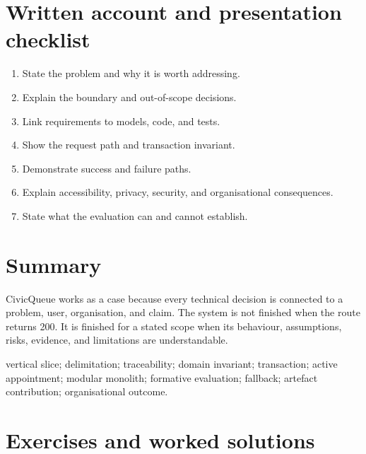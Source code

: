 \section{Written account and presentation checklist}
\begin{enumerate}
\item State the problem and why it is worth addressing.
\item Explain the boundary and out-of-scope decisions.
\item Link requirements to models, code, and tests.
\item Show the request path and transaction invariant.
\item Demonstrate success and failure paths.
\item Explain accessibility, privacy, security, and organisational consequences.
\item State what the evaluation can and cannot establish.
\end{enumerate}

\section{Summary}
CivicQueue works as a case because every technical decision is connected to a problem, user, organisation, and claim. The system is not finished when the route returns 200. It is finished for a stated scope when its behaviour, assumptions, risks, evidence, and limitations are understandable.

\begin{keyterms}vertical slice; delimitation; traceability; domain invariant; transaction; active appointment; modular monolith; formative evaluation; fallback; artefact contribution; organisational outcome.\end{keyterms}

\section{Exercises and worked solutions}


